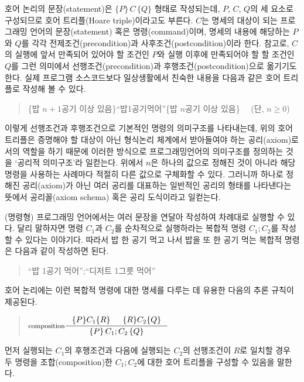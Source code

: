\documentclass[b5paper,chapter,figtabcapt]{oblivoir}
\begin{document}
호어 논리의 문장(statement)은 $\{P\}\,C\,\{Q\}$ 형태로 작성되는데,
$P$, $C$, $Q$의 세 요소로 구성되므로 호어 트리플(Hoare triple)이라고도
부른다. $C$는 명세의 대상이 되는 프로그래밍 언어의 문장(statement) 혹은
명령(command)이며, 명세의 내용에 해당하는 ${P}$와 ${Q}$를 각각
전제조건(precondition)과 사후조건(postcondition)이라 한다.
참고로, $C$의 실행에 앞서 만족되어 있어야 할 조건인 $P$와
실행 이후에 만족되어야 할 할 조건인 $Q$를 그런 의미에서
선행조건(precondition)과 후행조건(postcondition)으로 옮기기도 한다.
실제 프로그램 소스코드보다 일상생활에서 친숙한 내용을 다음과 같은
호어 트리플로 작성해 볼 수 있다.
\begin{quote}\small
\{밥 $n+1$공기 이상 있음\}\;``밥\;1공기\;먹어''\;\{밥 $n$공기 이상 있음\}
~~(단, $n\ge 0$)
\end{quote}
이렇게 선행조건과 후행조건으로 기본적인 명령의 의미구조를 나타내는데,
위의 호어 트리플은 증명해야 할 대상이 아닌 형식논리 체계에서
받아들여야 하는 공리(axiom)로서의 역할을 하기 때문에 이러한 방식으로
프로그래밍언어의 의미구조를 정의하는 것을 `공리적 의미구조'라
일컫는다. 위에서 $n$은 하나의 값으로 정해진 것이 아니라 해당 명령을
사용하는 사례마다 적절히 다른 값으로 구체화할 수 있다. 그러니까 하나로
정해진 공리(axiom)가 아닌 여러 공리를 대표하는 일반적인 공리의 형태를
나타낸다는 뜻에서 공리꼴(axiom schema) 혹은 공리 도식이라고 일컫는다.

(명령형) 프로그래밍 언어에서는 여러 문장을 연달아 작성하여 차례대로
실행할 수 있다. 달리 말하자면 명령 $C_1$과 $C_2$를 순차적으로 실행하라는
복합적 명령 $C_1;C_2$를 작성할 수 있다는 이야기다. 따라서 밥 한 공기
먹고 나서 밥을 또 한 공기 먹는 복합적 명령은 다음과 같이 작성하면 된다.
\begin{quote}\small
``밥 1공기 먹어'';``디저트 1그릇 먹어''
\end{quote}
호어 논리에는 이런 복합적 명령에 대한 명세를 다루는 데 유용한
다음의 추론 규칙이 제공된다.
\begin{quote}
\( \inference[composition]{ \{P\}C_1\{R\} & \{R\}C_2\{Q\} }{
                            \{P\}\,C_1;C_2\,\{Q\} } \)
\end{quote}
먼저 실행되는 $C_1$의 후행조건과 다음에 실행되는 $C_2$의 선행조건이
$R$로 일치할 경우 두 명령을 조합(composition)한 $C_1;C_2$에 대한
호어 트리플을 구성할 수 있음을 말한다.
\end{document}

